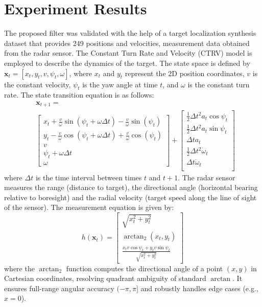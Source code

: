 \documentclass[10pt,twocolumn,twoside]{IEEEtran}
\newcommand{\x}{{ \bm{x} }}
\begin{document}
\section{Experiment Results} \label{sec:experiment}
The proposed filter was validated with the help of a target localization synthesis dataset that provides 249 positions and velocities, measurement data obtained from the radar sensor. The Constant Turn Rate and Velocity (CTRV) model is employed to describe the dynamics of the target. The state space is defined by $\x_t = [x_t,y_t,v,\psi_t,\omega]$, where $x_t$ and $y_t$ represent the 2D position coordinates, $v$ is the constant velocity, $\psi_t$ is the yaw angle at time $t$, and $\omega$ is the constant turn rate. The state transition equation is as follows: 
\begin{equation*}
\begin{split}
    &\x_{t+1}= \\
    & \begin{bmatrix} 
        x_t+\frac{v}{\omega}\sin(\psi_t+\omega\Delta t)-\frac{v}{\omega}\sin(\psi_t)\\
        y_t-\frac{v}{\omega}\cos(\psi_t+\omega\Delta t)+\frac{v}{\omega}\cos(\psi_t)\\
        v\\
        \psi_t+\omega\Delta t\\
        \omega
    \end{bmatrix} + \begin{bmatrix}
        \frac{1}{2}\Delta t^2a_t\cos\psi_t\\
        \frac{1}{2}\Delta t^2a_t\sin\psi_t\\
        \Delta t a_t\\
        \frac{1}{2}\Delta t^2\dot{\omega}_t\\
        \Delta t\dot{\omega}_t\\
    \end{bmatrix}
\end{split}
\end{equation*}
where $\Delta t$ is the time interval between times $t$ and $t+1$. The radar sensor measures the range (distance to target), the directional angle (horizontal bearing relative to boresight) and the radial velocity (target speed along the line of sight of the sensor). The measurement equation is given by:
\begin{equation*}
    h(\x_t) = \begin{bmatrix}
        \sqrt{x_t^2+y_t^2}\\
        \arctan_2(x_t,y_t)\\
        \frac{x_tv\cos\psi_t+y_tv\sin\psi_t}{\sqrt{x_t^2+y_t^2}}
    \end{bmatrix}
\end{equation*}
where the $\arctan_2$ function computes the directional angle of a point $(x,y)$ in Cartesian coordinates, resolving quadrant ambiguity of standard $\arctan$. It ensures full-range angular accuracy $(-\pi,\pi]$ and robustly handles edge cases (e.g., $x=0$).
\end{document}
